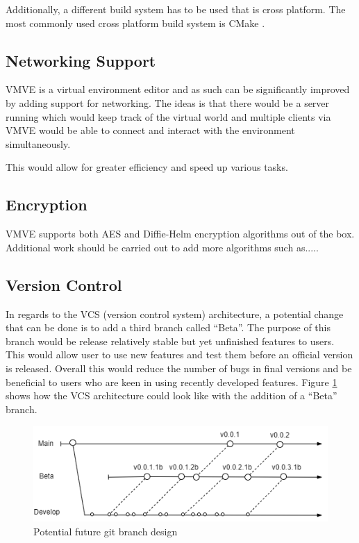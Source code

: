 \documentclass[11pt]{article}
\begin{document}
Additionally, a different build system has to be used that is cross platform.
The most commonly used cross platform build system is CMake \cite{cmake}.

\subsection{Networking Support}
VMVE is a virtual environment editor and as such can be significantly improved
by adding support for networking. The ideas is that there would be a server
running which would keep track of the virtual world and multiple clients via
VMVE would be able to connect and interact with the environment simultaneously.

This would allow for greater efficiency and speed up various tasks.

\subsection{Encryption}
VMVE supports both AES and Diffie-Helm encryption algorithms out of the box.
Additional work should be carried out to add more algorithms such as.....

\subsection{Version Control}
In regards to the VCS (version control system) architecture, a potential change
that can be done is to add a third branch called ``Beta''. The purpose of this
branch would be release relatively stable but yet unfinished features to users.
This would allow user to use new features and test them before an official
version is released. Overall this would reduce the number of bugs in final
versions and be beneficial to users who are keen in using recently developed
features. Figure \ref{fig:futurebrancharch} shows how the VCS architecture could
look like with the addition of a ``Beta'' branch.

\begin{figure}[h!]
  \centering
  \includegraphics[width=\textwidth]{images/future_branch_design.png}
  \caption{Potential future git branch design}
  \label{fig:futurebrancharch}
\end{figure}
\end{document}

